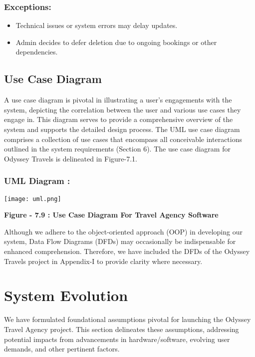 \documentclass{scrreprt}
\begin{document}
\subsection*{\textbf{Exceptions:}}

\begin{itemize}
    \item Technical issues or system errors may delay updates.
    \item Admin decides to defer deletion due to ongoing bookings or other dependencies.
\end{itemize}

\section{Use Case Diagram}

A use case diagram is pivotal in illustrating a user's engagements with the system, depicting the correlation between the user and various use cases they engage in. This diagram serves to provide a comprehensive overview of the system and supports the detailed design process. The UML use case diagram comprises a collection of use cases that encompass all conceivable interactions outlined in the system requirements (Section 6). The use case diagram for Odyssey Travels is delineated in Figure-7.1.

\subsection *{ UML Diagram : }
{\texttt{[image: uml.png]}}

\begin{center}
    \parbox{0.8\textwidth}{ 
        \centering
        \textbf{Figure - 7.9 : Use Case Diagram For Travel Agency Software}
    }
\end{center}

Although we adhere to the object-oriented approach (OOP) in developing our system, Data Flow Diagrams (DFDs) may occasionally be indispensable for enhanced comprehension. Therefore, we have included the DFDs of the Odyssey Travels project in Appendix-I to provide clarity where necessary.

\chapter{System Evolution}
We have formulated foundational assumptions pivotal for launching the Odyssey Travel Agency project. This section delineates these assumptions, addressing potential impacts from advancements in hardware/software, evolving user demands, and other pertinent factors.
\end{document}
